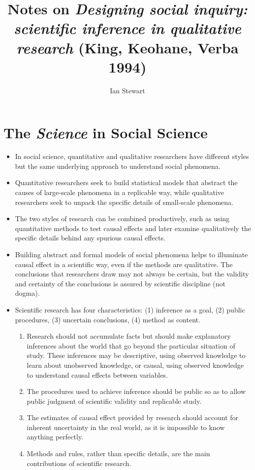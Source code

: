 \documentclass[11pt,letterpaper]{article}
\title{Notes on \textit{Designing social inquiry: scientific inference in qualitative research} (King, Keohane, Verba 1994)}
\author{Ian Stewart}
\begin{document}
\maketitle{}
\date{}

\section{The \emph{Science} in Social Science}
\begin{itemize}
\item In social science, quantitative and qualitative researchers have different styles but the same underlying approach to understand social phenomena. 
\item Quantitative researchers seek to build statistical models that abstract the causes of large-scale phenomena in a replicable way, while qualitative researchers seek to unpack the specific details of small-scale phenomena. 
\item The two styles of research can be combined productively, such as using quantitative methods to test causal effects and later examine qualitatively the specific details behind any spurious causal effects. 
\item Building abstract and formal models of social phenomena helps to illuminate causal effect in a scientific way, even if the methods are qualitative. The conclusions that researchers draw may not always be certain, but the validity and certainty of the conclusions is assured by scientific discipline (not dogma).
\item Scientific research has four characteristics: (1) inference as a goal, (2) public procedures, (3) uncertain conclusions, (4) method as content.
\begin{enumerate}
\item Research should not accumulate facts but should make explanatory inferences about the world that go beyond the particular situation of study. These inferences may be descriptive, using observed knowledge to learn about unobserved knowledge, or causal, using observed knowledge to understand causal effects between variables.
\item The procedures used to achieve inference should be public so as to allow public judgment of scientific validity and replicable study.
\item The estimates of causal effect provided by research should account for inherent uncertainty in the real world, as it is impossible to know anything perfectly.
\item Methods and rules, rather than specific details, are the main contributions of scientific research.

\end{enumerate}
\end{itemize}
\end{document}
